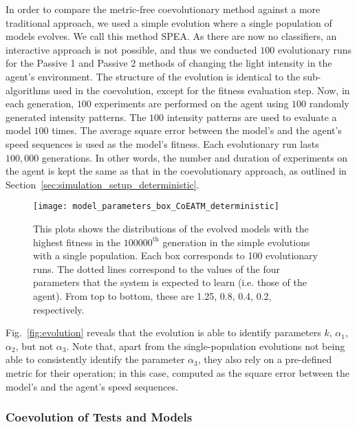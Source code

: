 In order to compare the metric-free coevolutionary method against a more traditional approach, we used a simple evolution where a single population of models evolves. We call this method SPEA. As there are now no classifiers, an interactive approach is not possible, and thus we conducted $100$ evolutionary runs for the Passive 1 and Passive 2 methods of changing the light intensity in the agent's environment. The structure of the evolution is identical to the sub-algorithms used in the coevolution, except for the fitness evaluation step. Now, in each generation, $100$ experiments are performed on the agent using $100$ randomly generated intensity patterns. The $100$ intensity patterns are used to evaluate a model $100$ times. The average square error between the model's and the agent's speed sequences is used as the model's fitness. Each evolutionary run lasts $100,000$ generations. In other words, the number and duration of experiments on the agent is kept the same as that in the coevolutionary approach, as outlined in Section~\ref{sec:simulation_setup_deterministic}.

\begin{figure}[!t]
	\centering
	\texttt{[image: model\_parameters\_box\_CoEATM\_deterministic]}
	\caption{This plots shows the distributions of the evolved models with the highest fitness in the $100000^\textrm{th}$ generation in the simple evolutions with a single population. Each box corresponds to 100 evolutionary runs. The dotted lines correspond to the values of the four parameters that the system is expected to learn (i.e. those of the agent). From top to bottom, these are 1.25, 0.8, 0.4, 0.2, respectively. \label{fig:model_parameters_box_CoEATM_deterministic}}
\end{figure}

Fig.~\ref{fig:evolution} reveals that the evolution is able to identify parameters $k$, $\alpha_1$, $\alpha_2$, but not $\alpha_3$. Note that, apart from the single-population evolutions not being able to consistently identify the parameter $\alpha_3$, they also rely on a pre-defined metric for their operation; in this case, computed as the square error between the model's and the agent's speed sequences. 

\subsubsection{Coevolution of Tests and Models}\label{sec:coevolution_of_tests_and_models}

